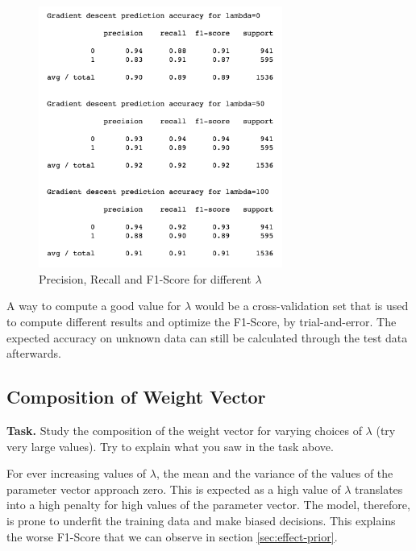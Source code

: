 \documentclass{support/acm_proc_article-sp}
\begin{document}
    \begin{figure}[!htbp]
        \centering
        \includegraphics[width=8cm]{images/results-lambda.png}
        \caption{Precision, Recall and F1-Score for different $\lambda$}
        \label{fig:results-lambda}
    \end{figure}

    A way to compute a good value for $\lambda$ would be a cross-validation set that is used to compute different results
    and optimize the F1-Score, by trial-and-error.
    The expected accuracy on unknown data can still be calculated through the test data afterwards.


    \subsection{Composition of Weight Vector}
    \vspace{\baselineskip}

    \textbf{Task.} Study the composition of the weight vector for varying choices of $\lambda$ (try very large values).
    Try to explain what you saw in the task above.

    For ever increasing values of $\lambda$, the mean and the variance of the values of the parameter vector approach
    zero.
    This is expected as a high value of $\lambda$ translates into a high penalty for high values of the parameter vector.
    The model, therefore, is prone to underfit the training data and make biased decisions.
    This explains the worse F1-Score that we can observe in section \ref{sec:effect-prior}.
\end{document}
